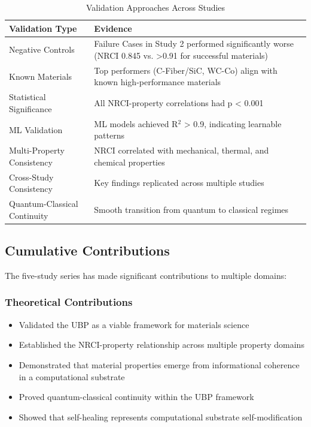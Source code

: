 \documentclass[11pt,a4paper]{article}
\begin{document}
\begin{table}[H]
\centering
\caption{Validation Approaches Across Studies}
\begin{tabular}{lp{8cm}}
\toprule
\textbf{Validation Type} & \textbf{Evidence} \\
\midrule
Negative Controls & Failure Cases in Study 2 performed significantly worse (NRCI 0.845 vs. >0.91 for successful materials) \\
Known Materials & Top performers (C-Fiber/SiC, WC-Co) align with known high-performance materials \\
Statistical Significance & All NRCI-property correlations had p < 0.001 \\
ML Validation & ML models achieved R$^2$ > 0.9, indicating learnable patterns \\
Multi-Property Consistency & NRCI correlated with mechanical, thermal, and chemical properties \\
Cross-Study Consistency & Key findings replicated across multiple studies \\
Quantum-Classical Continuity & Smooth transition from quantum to classical regimes \\
\bottomrule
\end{tabular}
\end{table}

\subsection{Cumulative Contributions}

The five-study series has made significant contributions to multiple domains:

\subsubsection{Theoretical Contributions}

\begin{itemize}
    \item Validated the UBP as a viable framework for materials science
    \item Established the NRCI-property relationship across multiple property domains
    \item Demonstrated that material properties emerge from informational coherence in a computational substrate
    \item Proved quantum-classical continuity within the UBP framework
    \item Showed that self-healing represents computational substrate self-modification
\end{itemize}
\end{document}
